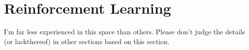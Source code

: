\chapter{Reinforcement Learning}

\r{I'm far less experienced in this space than others. Please don't judge the details (or lackthereof) in other sections based on this section.}